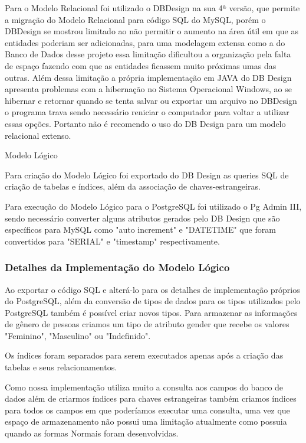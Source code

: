 \documentclass[12pt]{article}
\begin{document}
Para o Modelo Relacional foi utilizado o DBDesign na sua 4ª versão, que permite a migração do Modelo Relacional para código SQL do MySQL, porém o DBDesign se mostrou limitado ao não permitir o aumento na área útil em que as entidades poderiam ser adicionadas, para uma modelagem extensa como a do Banco de Dados desse projeto essa limitação dificultou a organização pela falta de espaço fazendo com que as entidades ficassem muito próximas umas das outras. Além dessa limitação a própria implementação em JAVA do DB Design apresenta problemas com a hibernação no Sistema Operacional Windows, ao se hibernar e retornar quando se tenta salvar ou exportar um arquivo no DBDesign o programa trava sendo necessário reniciar o computador para voltar a utilizar essas opções. Portanto não é recomendo o uso do DB Design para um modelo relacional extenso. 

Modelo Lógico

Para criação do Modelo Lógico foi exportado do DB Design as queries SQL de criação de tabelas e índices, além da associação de chaves-estrangeiras. 

Para execução do Modelo Lógico para o PostgreSQL foi utilizado o Pg Admin III, sendo necessário converter alguns atributos gerados pelo DB Design que são específicos para MySQL como "auto increment" e "DATETIME" que foram convertidos para "SERIAL" e "timestamp" respectivamente.


\subsubsection{Detalhes da Implementação do Modelo Lógico}

Ao exportar o código SQL e alterá-lo para os detalhes de implementação próprios do PostgreSQL, além da conversão de tipos de dados para os tipos utilizados pelo PostgreSQL também é possível criar novos tipos. Para armazenar as informações de gênero de pessoas criamos um tipo de atributo gender que recebe os valores "Feminino", "Masculino" ou "Indefinido".


Os índices foram separados para serem executados apenas após a criação das tabelas e seus relacionamentos.

Como nossa implementação utiliza muito a consulta aos campos do banco de dados além de criarmos índices para chaves estrangeiras também criamos índices para todos os campos em que poderíamos executar uma consulta, uma vez que espaço de armazenamento não possui uma limitação atualmente como possuia quando as formas Normais foram desenvolvidas.
\end{document}
